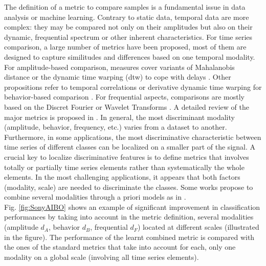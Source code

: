 The definition of a metric to compare samples is a fundamental issue in data analysis or machine learning. Contrary to static data, temporal data are more complex: they may be compared not only on their amplitudes but also on their dynamic, frequential spectrum or other inherent characteristics. For time series comparison, a large number of metrics have been proposed, most of them are designed to capture similitudes and differences based on one temporal modality. For amplitude-based comparison, measures cover variants of Mahalanobis distance or the dynamic time warping ({\sc dtw}) to cope with delays \cite{Berndt1994c,Rabiner1989,Sakoe1978b,Kruskall1983}. Other propositions refer to temporal correlations or derivative dynamic time warping for behavior-based comparison \cite{Abraham2010b,Rydell2008a,Caiado2006c,Keogh2001a,DUrso2009}. For frequential aspects, comparisons are mostly based on the Discret Fourier or Wavelet Transforms \cite{Sahidullah2012a,Kakizawa1998,Diaz2010,Zhang2006a}. A detailed review of the major metrics is proposed in \cite{Montero2014}. In general, the most discriminant modality (amplitude, behavior, frequency, etc.) varies from a dataset to another. \\
Furthermore, in some applications, the most discriminative characteristic between time series of different classes can be localized on a smaller part of the signal. A crucial key to localize discriminative features is to define metrics that involves totally or partially time series elements rather than systematically the whole elements. In the most challenging applications, it appears that both factors (modality, scale) are needed to discriminate the classes. Some works propose to combine several modalities through a priori models as in \cite{Douzal-Chouakria2010,Douzal-Chouakria2012a,Son2008}. \\
Fig. \ref{fig:SonyAIBO} shows an example of significant improvement in classification performances by taking into account in the metric definition, several modalities (amplitude $d_A$, behavior $d_B$, frequential $d_F$) located at different scales (illustrated in the figure). The performance of the learnt combined metric is compared with the ones of the standard metrics that take into account for each, only one modality on a global scale (involving all time series elements).  


